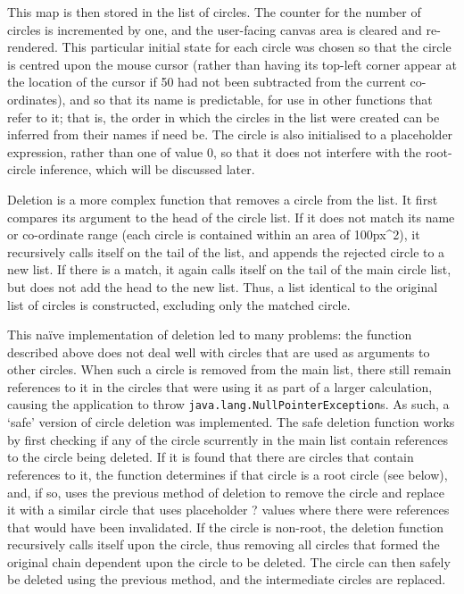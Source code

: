 \documentclass[12pt,twoside,notitlepage,xetex]{report}
\begin{document}
This map is then stored in the list of circles.  The counter for the number of circles is incremented by one, and the user-facing canvas area is cleared and re-rendered.  This particular initial state for each circle was chosen so that the circle is centred upon the mouse cursor (rather than having its top-left corner appear at the location of the cursor if 50 had not been subtracted from the current co-ordinates), and so that its name is predictable, for use in other functions that refer to it; that is, the order in which the circles in the list were created can be inferred from their names if need be.  The circle is also initialised to a placeholder expression, rather than one of value 0, so that it does not interfere with the root-circle inference, which will be discussed later.

Deletion is a more complex function that removes a circle from the list.  It first compares its argument to the head of the circle list.  If it does not match its name or co-ordinate range (each circle is contained within an area of 100px^2), it recursively calls itself on the tail of the list, and appends the rejected circle to a new list.  If there is a match, it again calls itself on the tail of the main circle list, but does not add the head to the new list.  Thus, a list identical to the original list of circles is constructed, excluding only the matched circle.

This naïve implementation of deletion led to many problems: the function described above does not deal well with circles that are used as arguments to other circles.  When such a circle is removed from the main list, there still remain references to it in the circles that were using it as part of a larger calculation, causing the application to throw \verb¬java.lang.NullPointerException¬s.  As such, a `safe' version of circle deletion was implemented.  The safe deletion function works by first checking if any of the circle scurrently in the main list contain references to the circle being deleted.  If it is found that there are circles that contain references to it, the function determines if that circle is a root circle (see below), and, if so, uses the previous method of deletion to remove the circle and replace it with a similar circle that uses placeholder {\sfapp ?} values where there were references that would have been invalidated.  If the circle is non-root, the deletion function recursively calls itself upon the circle, thus removing all circles that formed the original chain dependent upon the circle to be deleted.  The circle can then safely be deleted using the previous method, and the intermediate circles are replaced.
\end{document}

